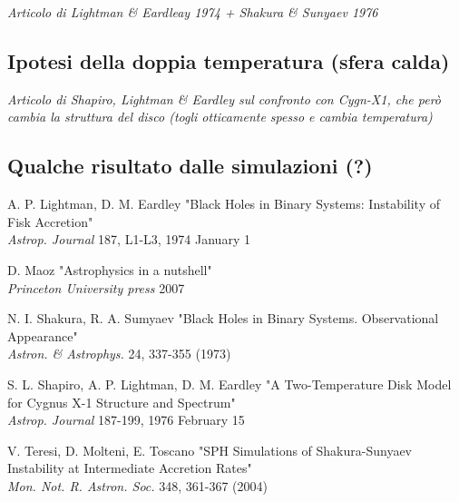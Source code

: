 \documentclass[a4paper]{article}
\begin{document}
		\emph{Articolo di Lightman \& Eardleay 1974 + Shakura \& Sunyaev 1976}

	\subsection{Ipotesi della doppia temperatura (sfera calda)}

		 \emph{Articolo di Shapiro, Lightman \& Eardley sul confronto con Cygn-X1, che però cambia la struttura del disco (togli otticamente spesso e cambia temperatura)}\\
	
	\subsection{Qualche risultato dalle simulazioni (?)}

\newpage
\begin{thebibliography}{9}
	A. P. Lightman, D. M. Eardley 
	"Black Holes in Binary Systems: Instability of Fisk Accretion"\\
	\textit{Astrop. Journal} 187, L1-L3, 1974 January 1
	
	D. Maoz 
	"Astrophysics in a nutshell"\\
	\textit{Princeton University press} 2007
	
	N. I. Shakura, R. A. Sumyaev 
	"Black Holes in Binary Systems. Observational Appearance"\\
	\textit{Astron. \& Astrophys.} 24, 337-355 (1973)

	S. L. Shapiro, A. P. Lightman, D. M. Eardley 
	"A Two-Temperature Disk Model for Cygnus X-1 Structure and Spectrum"\\
	\textit{Astrop. Journal} 187-199, 1976 February 15

	
	V. Teresi, D. Molteni, E. Toscano 
	"SPH Simulations of Shakura-Sunyaev Instability at Intermediate Accretion Rates"\\
	\textit{Mon. Not. R. Astron. Soc.} 348, 361-367 (2004)
\end{thebibliography}
\end{document}
